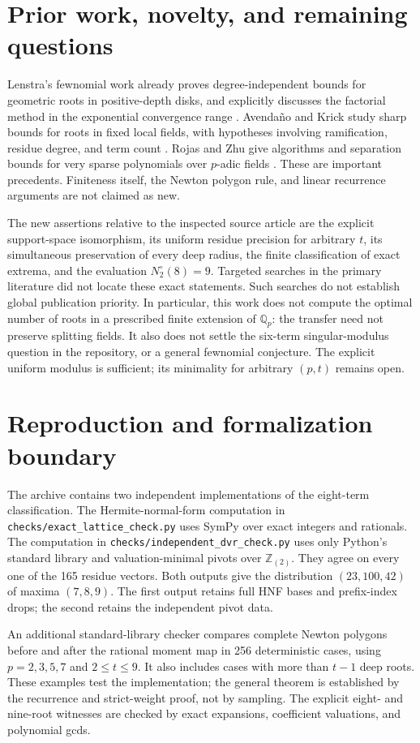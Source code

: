 \section{Prior work, novelty, and remaining questions}
Lenstra's fewnomial work already proves degree-independent bounds for
geometric roots in positive-depth disks, and explicitly discusses the
factorial method in the exponential convergence range \cite{Lenstra}.
Avenda\~no and Krick study sharp bounds for roots in fixed local fields,
with hypotheses involving ramification, residue degree, and term count
\cite{AvendanoKrick}. Rojas and Zhu give algorithms and separation bounds
for very sparse polynomials over $p$-adic fields \cite{RojasZhu}. These
are important precedents. Finiteness itself, the Newton polygon rule,
and linear recurrence arguments are not claimed as new.

The new assertions relative to the inspected source article are the
explicit support-space isomorphism, its uniform residue precision for
arbitrary $t$, its simultaneous preservation of every deep radius,
the finite classification of exact extrema, and the evaluation
$N_2^\circ(8)=9$. Targeted searches in the primary literature did not
locate these exact statements. Such searches do not establish global
publication priority. In particular, this work does not compute the
optimal number of roots in a prescribed finite extension of $\mathbb Q_p$:
the transfer need not preserve splitting fields. It also does not settle
the six-term singular-modulus question in the repository, or a general
fewnomial conjecture. The explicit uniform modulus is sufficient; its
minimality for arbitrary $(p,t)$ remains open.

\section{Reproduction and formalization boundary}
The archive contains two independent implementations of the eight-term
classification. The Hermite-normal-form computation in
\texttt{checks/exact\_lattice\_check.py} uses SymPy over exact integers and
rationals. The computation in \texttt{checks/independent\_dvr\_check.py}
uses only Python's standard library and valuation-minimal pivots over
$\mathbb Z_{(2)}$. They agree on every one of the 165 residue vectors.
Both outputs give the distribution $(23,100,42)$ of maxima $(7,8,9)$.
The first output retains full HNF bases and prefix-index drops; the second
retains the independent pivot data.

An additional standard-library checker compares complete Newton polygons
before and after the rational moment map in 256 deterministic cases,
using $p=2,3,5,7$ and $2\le t\le9$. It also includes cases with more
than $t-1$ deep roots. These examples test the implementation; the
general theorem is established by the recurrence and strict-weight proof,
not by sampling. The explicit eight- and nine-root witnesses are checked
by exact expansions, coefficient valuations, and polynomial gcds.

